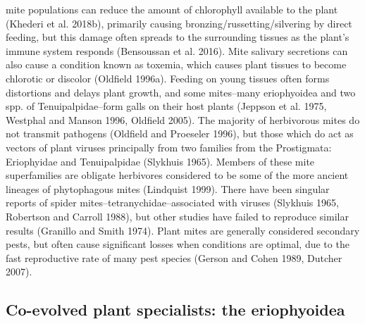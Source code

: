 \documentclass[12pt,final,CPage]{ufthesis}
\begin{document}
{mite populations can reduce the amount of chlorophyll available to the plant (Khederi et al. 2018b), primarily causing bronzing/russetting/silvering by direct feeding, but this damage often spreads to the surrounding tissues as the plant's immune system responds (Bensoussan et al. 2016). Mite salivary secretions can also cause a condition known as toxemia, which causes plant tissues to become chlorotic or discolor (Oldfield 1996a). Feeding on young tissues often forms distortions and delays plant growth, and some mites--many eriophyoidea and two spp. of Tenuipalpidae--form galls on their host plants (Jeppson et al. 1975, Westphal and Manson 1996, Oldfield 2005). The majority of herbivorous mites do not transmit pathogens (Oldfield and Proeseler 1996), but those which do act as vectors of plant viruses principally from two families from the Prostigmata: Eriophyidae and Tenuipalpidae (Slykhuis 1965). Members of these mite superfamilies are obligate herbivores considered to be some of the more ancient lineages of phytophagous mites (Lindquist 1999). There have been singular reports of spider mites--tetranychidae--associated with viruses (Slykhuis 1965, Robertson and Carroll 1988), but other studies have failed to reproduce similar results (Granillo and Smith 1974). Plant mites are generally considered secondary pests, but often cause significant losses when conditions are optimal, due to the fast reproductive rate of many pest species (Gerson and Cohen 1989, Dutcher 2007).

  \hypertarget{litrev-erios}{%
  \subsection{Co-evolved plant specialists: the eriophyoidea}\label{litrev-erios}}

}
\end{document}
